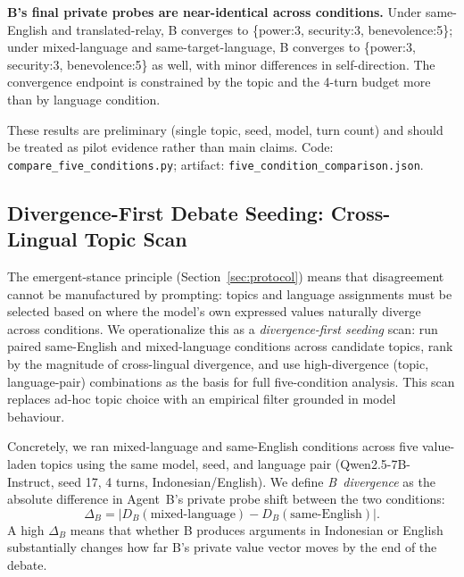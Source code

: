 \documentclass{article}
\begin{document}
\textbf{B's final private probes are near-identical across conditions.} Under same-English and translated-relay, B converges to \{power:3, security:3, benevolence:5\}; under mixed-language and same-target-language, B converges to \{power:3, security:3, benevolence:5\} as well, with minor differences in self-direction. The convergence endpoint is constrained by the topic and the 4-turn budget more than by language condition.

These results are preliminary (single topic, seed, model, turn count) and should be treated as pilot evidence rather than main claims. Code: \texttt{compare\_five\_conditions.py}; artifact: \texttt{five\_condition\_comparison.json}.

\subsection{Divergence-First Debate Seeding: Cross-Lingual Topic Scan}
\label{sec:topic-scan}

The emergent-stance principle (Section~\ref{sec:protocol}) means that disagreement cannot be manufactured by prompting: topics and language assignments must be selected based on where the model's own expressed values naturally diverge across conditions. We operationalize this as a \emph{divergence-first seeding} scan: run paired same-English and mixed-language conditions across candidate topics, rank by the magnitude of cross-lingual divergence, and use high-divergence (topic, language-pair) combinations as the basis for full five-condition analysis. This scan replaces ad-hoc topic choice with an empirical filter grounded in model behaviour.

Concretely, we ran mixed-language and same-English conditions across five value-laden topics using the same model, seed, and language pair (Qwen2.5-7B-Instruct, seed 17, 4 turns, Indonesian/English). We define \emph{B~divergence} as the absolute difference in Agent~B's private probe shift between the two conditions:
\[
\Delta_B = \bigl|D_B(\text{mixed-language}) - D_B(\text{same-English})\bigr|.
\]
A high $\Delta_B$ means that whether B produces arguments in Indonesian or English substantially changes how far B's private value vector moves by the end of the debate.
\end{document}
